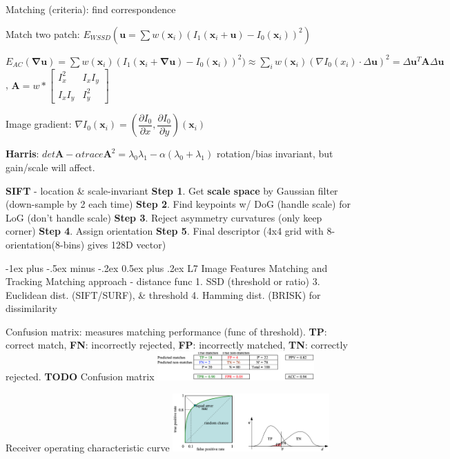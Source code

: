 \documentclass[10pt,landscape]{article}
\makeatletter
\renewcommand{\section}{\@startsection{section}{1}{0mm}%
                                {-1ex plus -.5ex minus -.2ex}%
                                {0.5ex plus .2ex}%
                                {\normalfont\large\bfseries}}
\makeatother
\begin{document}
\begin{multicols}{3}
Matching (criteria): find correspondence

Match two patch: $E_{WSSD}(\mathbf{u} = \sum w(\mathbf{x}_i) (I_1(\mathbf{x}_i + \mathbf{u}) - I_0(\mathbf{x}_i))^2)$

$E_{AC}(\mathbf{\nabla u}) = \sum w(\mathbf{x}_i) (I_1(\mathbf{x}_i + \mathbf{\nabla u}) - I_0(\mathbf{x}_i))^2)\approx \sum_i w(\mathbf{x}_i) (\nabla I_0(x_i)\cdot\Delta\mathbf{u})^2 =  \Delta\mathbf{u}^T\mathbf{A}\Delta\mathbf{u}$, $\mathbf{A} = w * \begin{bmatrix} I_x^2 & I_xI_y \\ I_xI_y & I^2_y\end{bmatrix}$

Image gradient: $\nabla I_0(\mathbf{x}_i) = (\dfrac{\partial I_0}{\partial x}, \dfrac{\partial I_0}{\partial y})(\mathbf{x}_i)$

\textbf{Harris}: $det \mathbf{A} - \alpha trace \mathbf{A}^2 = \lambda_0\lambda_1 - \alpha(\lambda_0+ \lambda_1)$ rotation/bias invariant, but gain/scale will affect.

\textbf{SIFT} - location \& scale-invariant
\textbf{Step 1}. Get \textbf{scale space} by Gaussian filter (down-sample by 2 each time)
\textbf{Step 2}. Find keypoints w/ DoG (handle scale) for LoG (don't handle scale)
\textbf{Step 3}. Reject asymmetry curvatures (only keep corner)
\textbf{Step 4}. Assign orientation
\textbf{Step 5}. Final descriptor
(4x4 grid with 8-orientation(8-bins) gives 128D vector)

\section{L7 Image Features Matching and Tracking}
Matching approach - distance func
1. SSD (threshold or ratio)
3. Euclidean dist. (SIFT/SURF), \& threshold
4. Hamming dist. (BRISK) for dissimilarity

Confusion matrix: measures matching performance (func of threshold). 
\textbf{TP}: correct match, 
\textbf{FN}: incorrectly rejected, 
\textbf{FP}: incorrectly matched, 
\textbf{TN}: correctly rejected. 
\textbf{TODO} Confusion matrix
\includegraphics[width=6cm]{images/confusion_mtx.png}

Receiver operating characteristic curve
\includegraphics[width=6cm]{images/roc.png}


\end{multicols}
\end{document}
